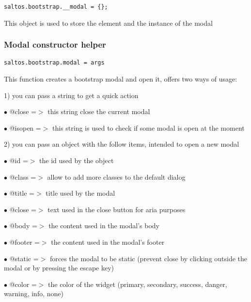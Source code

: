 \documentclass[a4paper]{article}
\begin{document}
\begin{lstlisting}
saltos.bootstrap.__modal = {};
\end{lstlisting}

This object is used to store the element and the instance of the modal

\hypertarget{toc105}{}
\subsubsection{Modal constructor helper}

\begin{lstlisting}
saltos.bootstrap.modal = args
\end{lstlisting}

This function creates a bootstrap modal and open it, offers two ways of usage:

1) you can pass a string to get a quick action

\begin{compactitem}
\item[\color{myblue}$\bullet$] @close   =$>$ this string close the current modal
\item[\color{myblue}$\bullet$] @isopen  =$>$ this string is used to check if some modal is open at the moment
\end{compactitem}

2) you can pass an object with the follow items, intended to open a new modal

\begin{compactitem}
\item[\color{myblue}$\bullet$] @id      =$>$ the id used by the object
\item[\color{myblue}$\bullet$] @class   =$>$ allow to add more classes to the default dialog
\item[\color{myblue}$\bullet$] @title   =$>$ title used by the modal
\item[\color{myblue}$\bullet$] @close   =$>$ text used in the close button for aria purposes
\item[\color{myblue}$\bullet$] @body    =$>$ the content used in the modal's body
\item[\color{myblue}$\bullet$] @footer  =$>$ the content used in the modal's footer
\item[\color{myblue}$\bullet$] @static  =$>$ forces the modal to be static (prevent close by clicking outside the modal or
            by pressing the escape key)
\item[\color{myblue}$\bullet$] @color   =$>$ the color of the widget (primary, secondary, success, danger, warning, info, none)
\end{compactitem}
\end{document}
